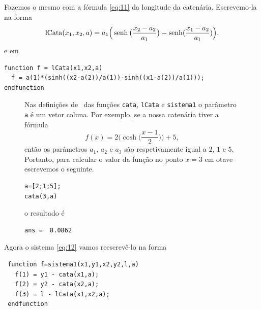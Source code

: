 Fazemos o mesmo com a fórmula \eqref{eq:11} da longitude da
catenária. Escrevemo-la na forma
\begin{displaymath}
  \operatorname{lCata}(x_1,x_2,a)= a_1\Big(\operatorname{senh}\big(\frac{x_2-a_2}{a_1}\big) - \operatorname{senh}(\frac{x_1-a_2}{a_1})\Big),
\end{displaymath}
e em \Octave
\begin{octavebox}
\begin{verbatim}
function f = lCata(x1,x2,a)
  f = a(1)*(sinh((x2-a(2))/a(1))-sinh((x1-a(2))/a(1)));
endfunction
\end{verbatim}
\end{octavebox}

\begin{figure}
  \vspace{-10px}
  \begin{figurebox}
    Nas definições de \Octave\ das funções \verb|cata|,
    \verb|lCata| e \verb|sistema1| o parâmetro \verb|a| é um vetor
    coluna. Por exemplo, se a nossa catenária tiver a fórmula
    \begin{displaymath}
      f(x) =  2\Big(\cosh\big(\frac{x-1}{2}\big)\Big)+5,
    \end{displaymath}
    então os parâmetros $a_1$, $a_2$ e $a_3$ são respetivamente
    igual a $2$, $1$ e $5$. Portanto, para calcular o valor da
    função no ponto $x= 3$ em otave escrevemos o seguinte.
    \begin{octavebox}
\begin{verbatim}
a=[2;1;5];
cata(3,a)
\end{verbatim}
    \end{octavebox}
    o resultado é
    \begin{octavebox}
\begin{verbatim}
ans =  8.0862
\end{verbatim}
    \end{octavebox}
  \end{figurebox}
  \vspace{-200px}
\end{figure}

Agora o sistema \eqref{eq:12} vamos reescrevê-lo na forma

\begin{octaveboxI}
\begin{verbatim}
 function f=sistema1(x1,y1,x2,y2,l,a)
   f(1) = y1 - cata(x1,a);
   f(2) = y2 - cata(x2,a);
   f(3) = l - lCata(x1,x2,a);
 endfunction
\end{verbatim}
\end{octaveboxI}

